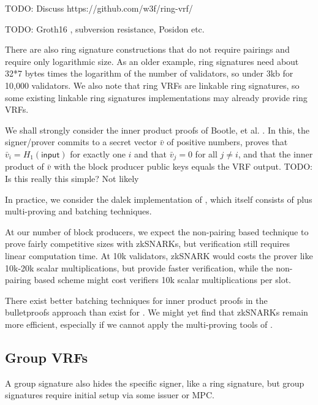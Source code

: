 TODO:  Discuss https://github.com/w3f/ring-vrf/

TODO:  Groth16 \cite{Groth16}, subversion resistance, Posidon etc.

There are also ring signature constructions that do not require pairings and require only logarithmic size.  As an older example, ring signatures \cite{GK2015} need about 32*7 bytes times the logarithm of the number of validators, so under 3kb for 10,000 validators.  We also note that ring VRFs are linkable ring signatures, so some existing linkable ring signatures implementations may already provide ring VRFs.


We shall strongly consider the inner product proofs of Bootle, et al. \cite{bccgp2016}.  In this, the signer/prover commits to a secret vector $\bar{v}$ of positive numbers, proves that $\bar{v}_i = H_1(\mathsf{input})$ for exactly one $i$ and that $\bar{v}_j = 0$ for all $j \ne i$, and that the inner product of $\bar{v}$ with the block producer public keys equals the VRF output.  TODO:  Is this really this simple?  Not likely

In practice, we consider the dalek implementation \cite{dalek_bulletproofs} of \cite{bulletproofs}, which itself consists of \cite{bccgp2016} plus multi-proving and batching techniques.

At our number of block producers, we expect the non-pairing based technique to prove fairly competitive sizes with zkSNARKs, but verification still requires linear computation time.  At 10k validators, zkSNARK would costs the prover like 10k-20k scalar multiplications, but provide faster verification, while the non-pairing based scheme might cost verifiers 10k scalar multiplications per slot.  

There exist better batching techniques for inner product proofs \cite{bccgp2016} in the bulletproofs approach \cite{bulletproofs} than exist for \cite{Groth16}.  We might yet find that zkSNARKs remain more efficient, especially if we cannot apply the multi-proving tools of \cite{bulletproofs}.

\subsection{Group VRFs}

A group signature also hides the specific signer, like a ring signature, but group signatures require initial setup via some issuer or MPC. 


